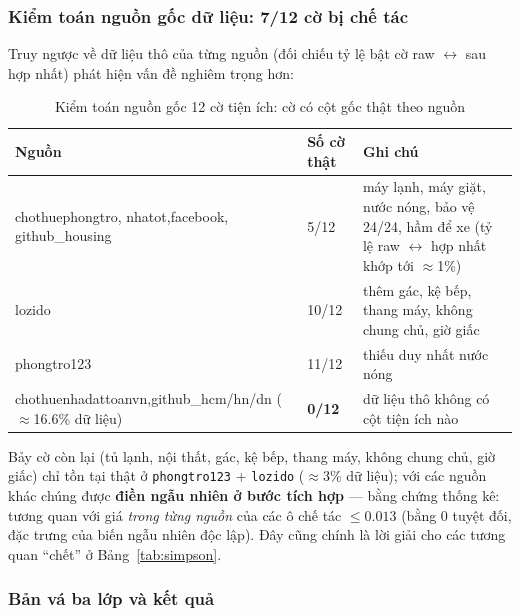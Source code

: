 \subsubsection*{Kiểm toán nguồn gốc dữ liệu: 7/12 cờ bị chế tác}

Truy ngược về dữ liệu thô của từng nguồn (đối chiếu tỷ lệ bật cờ
raw $\leftrightarrow$ sau hợp nhất) phát hiện vấn đề nghiêm trọng hơn:

\begin{table}[H]
  \centering
  \caption{Kiểm toán nguồn gốc 12 cờ tiện ích: cờ có cột gốc thật theo nguồn}
  \label{tab:audit_flags}
  \small
  \begin{tabularx}{\textwidth}{@{}L{4.6cm} C{2.2cm} X@{}}
    \toprule
    \textbf{Nguồn} & \textbf{Số cờ thật} & \textbf{Ghi chú} \\
    \midrule
    chothuephongtro, nhatot,\newline facebook, github\_housing & 5/12 &
      máy lạnh, máy giặt, nước nóng, bảo vệ 24/24, hầm để xe
      (tỷ lệ raw $\leftrightarrow$ hợp nhất khớp tới $\approx$1\%) \\
    lozido & 10/12 & thêm gác, kệ bếp, thang máy, không chung chủ, giờ giấc \\
    phongtro123 & 11/12 & thiếu duy nhất nước nóng \\
    chothuenhadattoanvn,\newline github\_hcm/hn/dn ($\approx$16.6\% dữ liệu) & \textbf{0/12} &
      dữ liệu thô không có cột tiện ích nào \\
    \bottomrule
  \end{tabularx}
\end{table}

Bảy cờ còn lại (tủ lạnh, nội thất, gác, kệ bếp, thang máy, không chung chủ, giờ giấc)
chỉ tồn tại thật ở \texttt{phongtro123} + \texttt{lozido} ($\approx$3\% dữ liệu);
với các nguồn khác chúng được \textbf{điền ngẫu nhiên ở bước tích hợp} —
bằng chứng thống kê: tương quan với giá \textit{trong từng nguồn} của các ô chế tác
$\leq 0.013$ (bằng 0 tuyệt đối, đặc trưng của biến ngẫu nhiên độc lập).
Đây cũng chính là lời giải cho các tương quan ``chết'' ở Bảng~\ref{tab:simpson}.

\subsubsection*{Bản vá ba lớp và kết quả}

